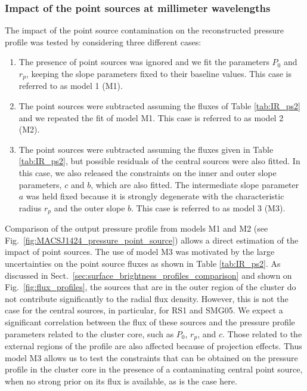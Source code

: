 \documentclass[traditabstract]{aa}
\begin{document}
\subsubsection{Impact of the point sources at millimeter wavelengths}
The impact of the point source contamination on the reconstructed pressure profile was tested by considering three different cases: 
\begin{enumerate}
\item The presence of point sources was ignored and we fit the parameters $P_0$ and $r_p$, keeping the slope parameters fixed to their baseline values. This case is referred to as model 1 (M1).
\item The point sources were subtracted assuming the fluxes of Table \ref{tab:IR_ps2} and we repeated the fit of model M1. This case is referred to as model 2 (M2).
\item The point sources were subtracted assuming the fluxes given in Table \ref{tab:IR_ps2}, but possible residuals of the central sources were also fitted. In this case, we also released the constraints on the inner and outer slope parameters, $c$ and $b$, which are also fitted. The intermediate slope parameter $a$ was held fixed because it is strongly degenerate with the characteristic radius $r_p$ and the outer slope $b$. This case is referred to as model 3 (M3).
\end{enumerate}
Comparison of the output pressure profile from models M1 and M2 (see Fig.~\ref{fig:MACSJ1424_pressure_point_source}) allows a direct estimation of the impact of point sources. The use of model M3 was motivated by the large uncertainties on the point source fluxes as shown in Table \ref{tab:IR_ps2}. As discussed in Sect.~\ref{sec:surface_brightness_profiles_comparison} and shown on Fig.~\ref{fig:flux_profiles}, the sources that are in the outer region of the cluster do not contribute significantly to the radial flux density. However, this is not the case for the central sources, in particular, for RS1 and SMG05. We expect a significant correlation between the flux of these sources and the pressure profile parameters related to the cluster core, such as $P_0$, $r_p$, and $c$. Those related to the external regions of the profile are also affected because of projection effects. Thus model M3 allows us to test the constraints that can be obtained on the pressure profile in the cluster core in the presence of a contaminating central point source, when no strong prior on its flux is available, as is the case here.
\end{document}
